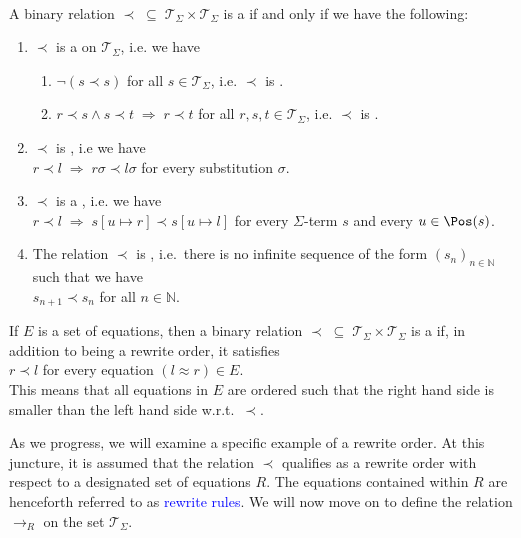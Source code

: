 \begin{Definition} \hspace*{\fill} \\
  A binary relation $\prec \;\subseteq\; \mathcal{T}_\Sigma \times \mathcal{T}_\Sigma$ is a
   if and only if we have the following:
  \begin{enumerate}
  \item $\prec$ is a  on $\mathcal{T}_\Sigma$, i.e. we have
        \begin{enumerate}
        \item $\neg (s \prec s)$ \hspace*{2.6cm} for all $s \in \mathcal{T}_\Sigma$, i.e. $\prec$ is .
        \item $r \prec s \wedge s \prec t \;\Rightarrow\; r \prec t$ \quad for all $r,s,t \in \mathcal{T}_\Sigma$,
              i.e. $\prec$ is . 
        \end{enumerate}
    
  \item $\prec$ is , i.e we have
        \\[0.2cm]
        \hspace*{1.3cm}
        $r \prec l \;\Rightarrow\; r\sigma \prec l\sigma$ \quad for every substitution $\sigma$.
  \item $\prec$ is a , i.e. we have
        \\[0.2cm]
        \hspace*{1.3cm}
        $r \prec l \;\Rightarrow\; s[u \mapsto r] \prec s[u \mapsto l]$ for every $\Sigma$-term $s$ and every
        $u \in\Pos(s)  $.
  \item The relation $\prec$ is , i.e.~there is no infinite sequence of the form
        $(s_n)_{n\in\mathbb{N}}$ such that we have
        \\[-0.2cm]
        \hspace*{1.3cm}
        $s_{n+1} \prec s_n$ \quad for all $n \in \mathbb{N}$. 
  \end{enumerate}
  If $E$ is a set of equations, then a binary relation $\prec \;\subseteq\; \mathcal{T}_\Sigma \times \mathcal{T}_\Sigma$
  is a  if, in addition to being a rewrite order, it satisfies
  \\[0.2cm]
  \hspace*{1.3cm}
  $r \prec l$ \quad for every equation $(l \approx r) \in E$.
  \\[0.2cm]    
  This means that all equations in $E$ are ordered such that the right hand side is smaller than the left
  hand side w.r.t.~$\prec$.    \eod
\end{Definition}
As we progress, we will examine a specific example of a rewrite order. At this juncture, it is assumed that the
relation $\prec$ qualifies as a rewrite order with respect to a designated set of equations $R$. The equations
contained within $R$ are henceforth referred to as \textcolor{blue}{rewrite rules}. We will now move on to
define the relation $\rightarrow_R$ on the set $\mathcal{T}_\Sigma$. 


